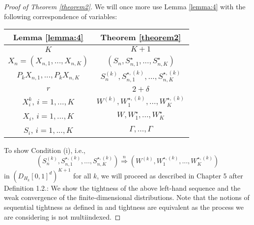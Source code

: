 

\begin{proof}[Proof of Theorem \ref{theorem2}]
    We will once more use Lemma \ref{lemma:4} with the following correspondence of variables:
    \begin{center}
        \begin{tabular}{|c | c|} 
            \hline
            Lemma \ref{lemma:4} & Theorem \ref{theorem2} \\ [0.5ex] 
            \hline\hline
            $K$ & $K+1$ \\ 
            \hline
            $X_n = (X_{n, 1}, ..., X_{n, K})$ & $(S_n, S_{n, 1}^\star, ..., S_{n, K}^\star)$ \\
            \hline
            $P_k X_{n, 1}, ..., P_k X_{n, K}$ & $S_n^{(k)}, S_{n, 1}^{\star, (k)}, ..., S_{n, K}^{\star, (k)}$ \\
            \hline
            $r$ & $2+\delta$ \\
            \hline
            $X_i^k$, $i = 1, ..., K$ & $W^{(k)}, W_1^{\star, (k)}, ..., W_K^{\star, (k)}$ \\ 
            \hline
            $X_i$, $i = 1, ..., K$ & $W, W_1^\star, ..., W_K^\star$ \\
            \hline
            $S_i$, $i = 1, ..., K$ & $\Gamma, ..., \Gamma$ \\  %
            \hline
        \end{tabular}
    \end{center}
    To show Condition (i), i.e.,
    \[ (S_n^{(k)}, S_{n, 1}^{\star, (k)}, ..., S_{n, K}^{\star, (k)}) \stackrel{n}{\Rightarrow} (W^{(k)}, W_1^{\star, (k)}, ..., W_K^{\star, (k)}) \]
    in $(D_{H_k}[0,1]^d)^{K+1}$ for all $k$, we will proceed as described in \cite{[11]bulinksi2007limittheorems} Chapter 5 after Definition 1.2.:  We show the tightness of the above left-hand sequence and the weak convergence of the finite-dimensional distributions. Note that the notions of sequential tightness as defined in \cite{[11]bulinksi2007limittheorems} and tightness are equivalent as the process we are considering is not multiindexed.


\end{proof}
